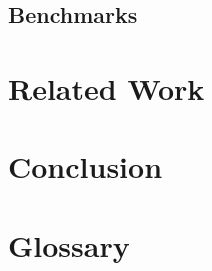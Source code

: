 \documentclass[12pt]{report}
\begin{document}
\section{Benchmarks}


\chapter{Related Work}

\chapter{Conclusion}

\chapter{Glossary}

\printglossary[type=\acronymtype]

{}

\end{document}
